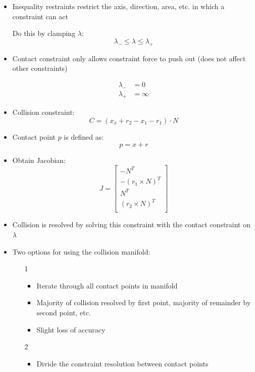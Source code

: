 \documentclass[a4paper]{article}
\begin{document}
\begin{itemize}
  \item
    Inequality restraints restrict the axis, direction, area, etc. in which a
    constraint can act

    Do this by clamping $\lambda$:
    \[
      \lambda_{-} \leq \lambda \leq \lambda_{+}
    \]

  \item
    Contact constraint only allows constraint force to push out (does not affect
    other constraints)

    \begin{align*}
      \lambda_{-} &= 0 \\
      \lambda_{+} &= \infty
    \end{align*}

  \item
    Collision constraint:
    \[
      C = (x_{x} + r_{2} - x_{1} - r_{1}) \cdot N
    \]

  \item
    Contact point $p$ is defined as:
    \[
      p = x + r
    \]

  \item
    Obtain Jacobian:
    \[
      J = \left[
            \begin{array}{c}
              -N^{T}                \\
              -(r_{1} \times N)^{T} \\
              N^{T}                 \\
              (r_{2} \times N)^{T}  \\
            \end{array}
          \right]
    \]

  \item
    Collision is resolved by solving this constraint with the contact constraint
    on $\lambda$

  \item
    Two options for using the collision manifold:
    \begin{enumerate}
      \item[1]
        \begin{itemize}
          \item
            Iterate through all contact points in manifold

          \item
            Majority of collision resolved by first point, majority of remainder
            by second point, etc.

          \item
            Slight loss of accuracy

        \end{itemize}

      \item[2]
        \begin{itemize}
          \item
            Divide the constraint resolution between contact points

        \end{itemize}
    \end{enumerate}

\end{itemize}
\end{document}
